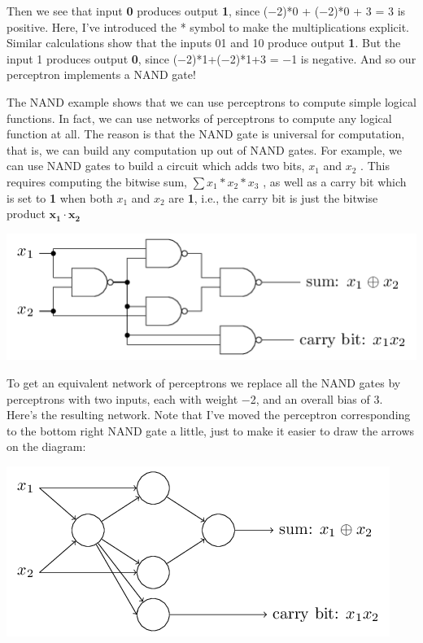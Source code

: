 \documentclass[a4paper,12pt]{report}%
\begin{document}
Then we see that input \textbf{0} produces output \textbf{1}, since (−2)*0 + (−2)*0 + 3 = 3 is positive. Here, I've introduced the * symbol to make the multiplications explicit. Similar calculations show that the inputs 01 and 10 produce output \textbf{1}. But the input 1 produces output \textbf{0}, since (−2)*1+(−2)*1+3 = −1 is negative. And so our perceptron implements a NAND gate!


The NAND example shows that we can use perceptrons to compute simple logical functions. In fact, we can use networks of perceptrons to compute any logical function at all. The reason is that the NAND gate is universal for computation, that is, we can build any computation up out of NAND gates. For example, we can use NAND gates to build a circuit which adds two bits, $x_{1}$  and $x_{2}$ . This requires computing the bitwise sum, $\sum x_{1}*x_{2}*x_{3}$ , as well as a carry bit which is set to \textbf{1} when both $x_{1}$ and $x_{2}$ are \textbf{1}, i.e., the carry bit is just the bitwise product $\mathbf{x_{1}} \cdot \mathbf{x_{2}}$


\begin{center}
 \includegraphics[width=1.0\linewidth]{images/tikz3.png}
\end{center}

To get an equivalent network of perceptrons we replace all the NAND gates by perceptrons with two inputs, each with weight −2, and an overall bias of 3. Here's the resulting network. Note that I've moved the perceptron corresponding to the bottom right NAND gate a little, just to make it easier to draw the arrows on the diagram:

\begin{center}
 \includegraphics[width=0.8\linewidth]{images/tikz4.png}
\end{center}
\end{document}
